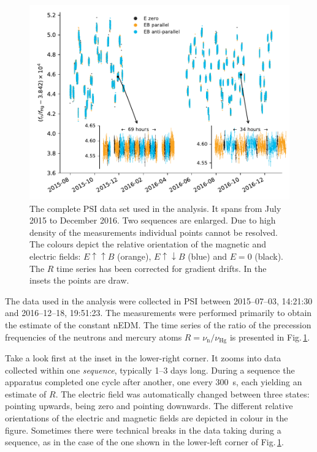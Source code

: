 
\begin{figure}
  \centering
  \includegraphics[width=0.9\linewidth]{gfx/axions/deltah4mm_time_domain_inset_no_yerr.pdf}
  \caption{The complete PSI data set used in the analysis. It spans from July 2015 to December 2016. Two sequences are enlarged. Due to high density of the measurements individual points cannot be resolved. The colours depict the relative orientation of the magnetic and electric fields: $E \uparrow \uparrow B$ (orange), $E \uparrow \downarrow B$ (blue) and $E=0$ (black). The $R$ time series has been corrected for gradient drifts. In the insets the points are draw.}\label{fig:PSI_dataset_time_domain}
\end{figure}

The data used in the analysis were collected in PSI between 2015--07--03, 14:21:30 and 2016--12--18, 19:51:23. The measurements were performed primarily to obtain the estimate of the constant nEDM\@. The time series of the ratio of the precession frequencies of the neutrons and mercury atoms $R = \nu_\text{n} / \nu_\text{Hg}$ is presented in Fig.\,\ref{fig:PSI_dataset_time_domain}.

Take a look first at the inset in the lower-right corner. It zooms into data collected within one \emph{sequence}, typically 1--3 days long.
During a sequence the apparatus completed one cycle after another, one every \SI{300}{\second}, each yielding an estimate of $R$.
The electric field was automatically changed between three states: pointing upwards, being zero and pointing downwards. The different relative orientations of the electric and magnetic fields are depicted in colour in the figure. Sometimes there were technical breaks in the data taking during a sequence, as in the case of the one shown in the lower-left corner of Fig.\,\ref{fig:PSI_dataset_time_domain}.

